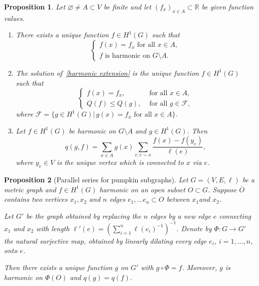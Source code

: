 \documentclass[10pt,a4paper]{amsart}
\newtheorem{prop}{Proposition}
\newcommand{\R}{\mathbb{R}}     %
\begin{document}
\begin{prop} \label{Prop: Harmonic extension}
	Let $\varnothing \neq A \subset V$ be finite and let $(f_x)_{x \in A} \subset \R$ be given function values.
	\begin{enumerate}
		\item [(i)] \label{1:HarmonicExtension} There exists a unique function $f \in H^1(G)$ such that 
		\begin{equation} \label{harmonic extension}
			\begin{cases}
			f(x) = f_x \text{ for all } x \in A, \\
			f \text{ is harmonic on } G\setminus A. 
		\end{cases}
		\end{equation}
	
	\item [(ii)] \label{2:HarmonicExtension} The solution of~\eqref{harmonic extension} is the unique function $f \in H^1(G)$ such that
		\begin{equation} \label{harmonic extension minimum}
			\begin{cases}
			f(x) = f_x, & \text{ for all } x \in A, \\
			Q(f)\le Q(g), & \text{ for all }  g \in \mathcal{F},
			\end{cases}
		\end{equation}
	where $\mathcal{F} = \{g \in H^1(G)| \, g(x) = f_x \text{ for all } x \in A\}$. 
	\item [(iii)] \label{3:HarmonicExtension} Let $f\in H^1(G)$ be harmonic on $G \setminus A$ and $g \in H^1(G)$. Then 
	\begin{equation} \label{harmonic extension IBP}
	q(g,f) =  \sum_{x \in A}g(x) \sum_{e: e \sim x } \frac{f(x) - f(y_e)}{\ell(e)},
	\end{equation}
	where $y_e \in V$ is the unique vertex which is connected to $x$ via $e$.  
	\end{enumerate}
\end{prop}

\begin{prop}[Parallel series for pumpkin subgraphs] \label{prop: surgery}
	Let $G=(V,E, \ell)$ be a metric graph and $f \in H^1(G)$ harmonic on an open subset $O\subset G$.
	Suppose $ \overline{O}$ contains two vertices $x_1, x_2$ and $n$ edges $e_1, \dots e_n \subset O$ between $x_1 $and $x_2$.

	Let $G'$ be the graph obtained by replacing the $n$ edges by a new edge $e$ connecting $x_1$ and $x_2$ with length $\ell'(e)=\left(\sum_{i=1}^{n} \ell(e_i)^{-1}\right)^{-1}$. Denote by $\Phi\colon G \to G'$ the natural surjective map, obtained by linearly dilating every edge $e_i$, $i = 1, \dots, n$, onto $e$.
	
	Then there exists a unique function $g$ on $G'$ with $g \circ \Phi = f$. Moreover, $g$ is harmonic on $\Phi(O)$ and $q(g) = q(f)$. 
\end{prop}
\end{document}
